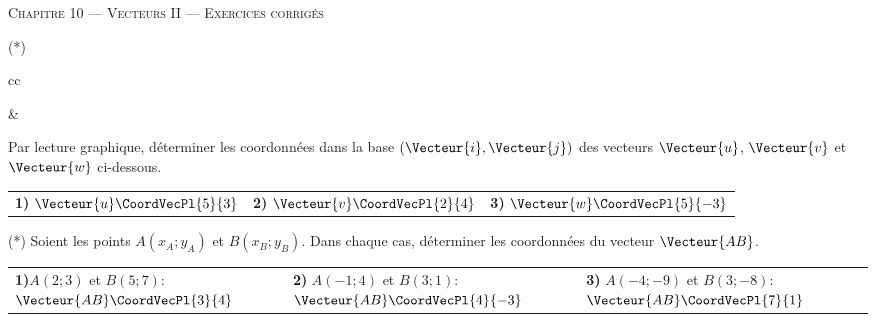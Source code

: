 \documentclass[a4paper]{article}
\begin{document}
\begin{center}
  {\scshape\LARGE Chapitre 10 --- Vecteurs II --- Exercices corrigés\par}
\end{center}

\begin{exercice}{(*)}{}

  \begin{tabular}{cc}
    \begin{minipage}{7cm}
      \begin{center}
        \begin{tikzpicture}[scale=0.5,y=1cm,xmin=-4,xmax=7,ymin=-1,ymax=6,
          xgrille=1,xgrilles=1,ygrille=1,ygrilles=1]
          \GrilleTikz %
          \AxesTikz %
          \AxeyTikz[AffGrad=false]{}
    
          \draw[very thick, ->, Red!50!white] (0,0) -- (1,0) node[midway, below] {$\Vecteur{i}$};
          \draw[very thick, ->, Red!50!white] (0,0) -- (0,1) node[midway, left] {$\Vecteur{j}$};
    
    
          \draw[very thick, ->, ForestGreen] (-3,1) -- (-1,5) node[midway, above left] {$\Vecteur{v}$};
          \draw[very thick, ->, Blue] (1,2) -- (6,5) node[midway, above] {$\Vecteur{u}$};
          \draw[very thick, ->, Red] (3,0) -- (5,0) node[midway, above] {$\Vecteur{w}$};
        \end{tikzpicture}
      \end{center}   
    \end{minipage}&
    \begin{minipage}{8cm}
      Par lecture graphique, déterminer les coordonnées dans la base $(\Vecteur{i}, \Vecteur{j})$ des vecteurs $\Vecteur{u}$, $\Vecteur{v}$ et $\Vecteur{w}$ ci-dessous.
\begin{center}

  \begin{tabularx}{.95\linewidth}{X X X }
    \textbf{1)} $\Vecteur{u}\CoordVecPl{5}{3}$ & \textbf{2)} $\Vecteur{v}\CoordVecPl{2}{4}$ & 
    \textbf{3)}  $\Vecteur{w}\CoordVecPl{5}{-3}$\\
    \end{tabularx}
\end{center}
    \end{minipage}
  \end{tabular}

\end{exercice}

\begin{exercice}{(*)}{}
  Soient les points $A(x_A;y_A)$ et $B(x_B;y_B)$. Dans chaque cas, déterminer les coordonnées du vecteur $\Vecteur{AB}$.
  \begin{center}
    \begin{tabularx}{.95\linewidth}{X X X }
      \textbf{1)}$A(2;3)$ et $B(5;7)$: $\Vecteur{AB}\CoordVecPl{3}{4}$ & \textbf{2)} $A(-1;4)$ et $B(3;1)$: $\Vecteur{AB}\CoordVecPl{4}{-3}$ & 
      \textbf{3)} $A(-4;-9)$ et $B(3;-8)$: $\Vecteur{AB}\CoordVecPl{7}{1}$\\
    \end{tabularx}
  \end{center}
\end{exercice}
\end{document}
